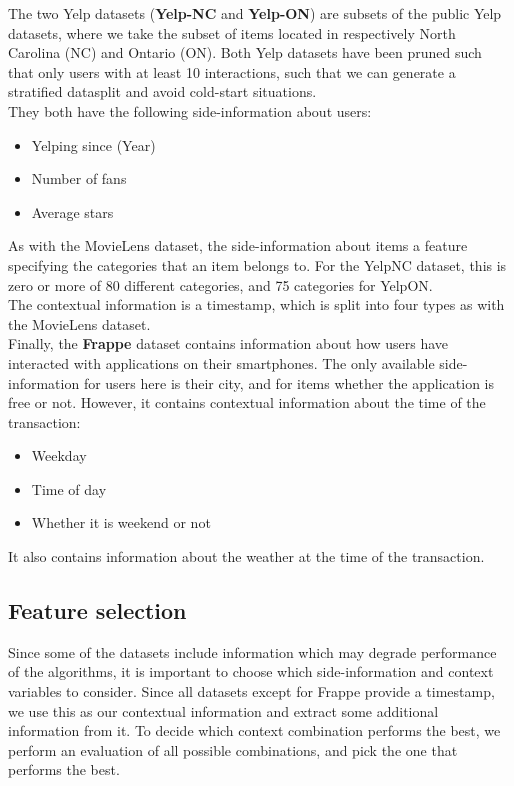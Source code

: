 The two Yelp datasets (\textbf{Yelp-NC} and \textbf{Yelp-ON}) are subsets of the public Yelp datasets, where we take the subset of items located in respectively North Carolina (NC) and Ontario (ON).
Both Yelp datasets have been pruned such that only users with at least 10 interactions, such that we can generate a stratified datasplit and avoid cold-start situations.\\
They both have the following side-information about users:
\begin{itemize}
    \item Yelping since (Year)
    \item Number of fans
    \item Average stars 
\end{itemize}
As with the MovieLens dataset, the side-information about items a feature specifying the categories that an item belongs to.
For the YelpNC dataset, this is zero or more of 80 different categories, and 75 categories for YelpON.\\
The contextual information is a timestamp, which is split into four types as with the MovieLens dataset.\\
Finally, the \textbf{Frappe} dataset contains information about how users have interacted with applications on their smartphones.
The only available side-information for users here is their city, and for items whether the application is free or not.
However, it contains contextual information about the time of the transaction:
\begin{itemize}
    \item Weekday
    \item Time of day
    \item Whether it is weekend or not
\end{itemize}
It also contains information about the weather at the time of the transaction.

\subsection{Feature selection}
Since some of the datasets include information which may degrade performance of the algorithms, it is important to choose which side-information and context variables to consider.
Since all datasets except for Frappe provide a timestamp, we use this as our contextual information and extract some additional information from it.
To decide which context combination performs the best, we perform an evaluation of all possible combinations, and pick the one that performs the best.\\

